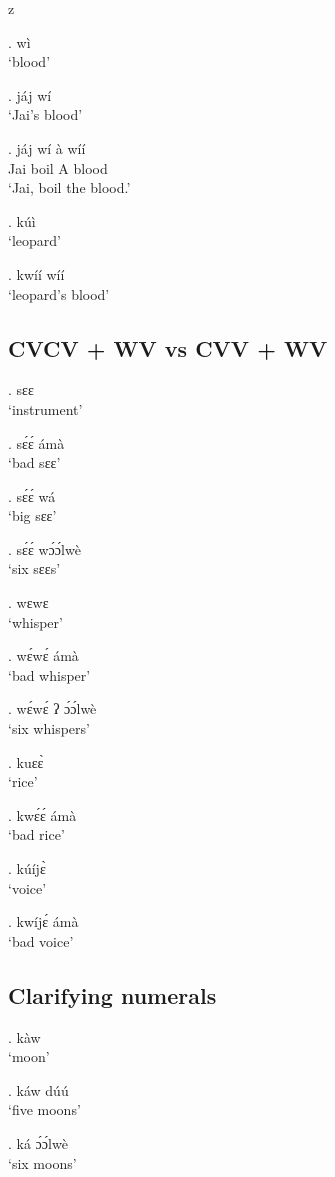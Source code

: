 z   \documentclass{assets/fieldnotes}
\begin{document}
\ex. wì \\
`blood'

\ex. jáj wí \\
`Jai's blood'

\exg. jáj wí à wíí \\
Jai boil A blood \\
`Jai, boil the blood.'

\ex. kúì \\
`leopard'

\ex. kwíí wíí \\
`leopard's blood'

\subsection{CVCV + WV vs CVV + WV}

\ex. sɛɛ \\
`instrument'

\ex. sɛ́ɛ́ ámà \\
`bad sɛɛ'


\ex. sɛ́ɛ́ wá \\
`big sɛɛ'

\ex. sɛ́ɛ́ wɔ́ɔ́lwè \\
`six sɛɛs'

\ex. wɛwɛ \\
`whisper'

\ex. wɛ́wɛ́ ámà \\
`bad whisper'

\ex. wɛ́wɛ́ ʔ ɔ́ɔ́lwè\\
`six whispers'

\ex. kuɛɛ̀ \\
`rice'

\ex. kwɛ́ɛ́ ámà \\
`bad rice'

\ex. kúíjɛ̀ \\
`voice'

\ex. kwíjɛ́ ámà \\
`bad voice'

\subsection{Clarifying numerals}

\ex. kàw \\
`moon'

\ex. káw dúú \\ 
`five moons'

\ex. ká ɔ́ɔ́lwè \\
`six moons'
\end{document}

